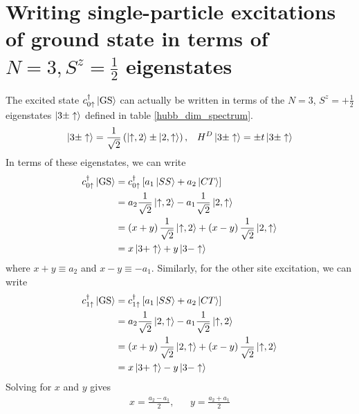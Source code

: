 \documentclass[prb]{revtex4-2}
\begin{document}
\section{Writing single-particle excitations of ground state in terms of $N=3, S^z = \frac{1}{2}$ eigenstates}
The excited state $c^\dagger_{0\uparrow}\ket{\text{GS}}$ can actually be written in terms of the $N=3$, $S^z = + \frac{1}{2}$ eigenstates $\ket{3\pm\uparrow}$ defined in table \ref{hubb_dim_spectrum}.
\begin{equation}\begin{aligned}
	\ket{3\pm \uparrow} = \frac{1}{\sqrt 2}\left(\ket{\uparrow, 2} \pm \ket{2, \uparrow}\right), && H^D \ket{3\pm \uparrow} = \pm t\ket{3\pm \uparrow}
\end{aligned}\end{equation}
In terms of these eigenstates, we can write
\begin{equation}\begin{aligned}
	c^\dagger_{0\uparrow}\ket{\text{GS}} 
	&= c^\dagger_{0\uparrow}\left[a_1 \ket{SS} + a_2 \ket{CT}\right] \\
	&= a_2 \frac{1}{\sqrt 2}\ket{\uparrow,2} - a_1 \frac{1}{\sqrt 2}\ket{2, \uparrow}\\
	&= \left(x + y\right) \frac{1}{\sqrt 2}\ket{\uparrow,2} + \left(x - y\right) \frac{1}{\sqrt 2}\ket{2, \uparrow}\\
	&=x\ket{3+ \uparrow} + y\ket{3- \uparrow}
\end{aligned}\end{equation}
where $x + y \equiv a_2$ and $x-y \equiv -a_1$. Similarly, for the other site excitation, we can write
\begin{equation}\begin{aligned}
	c^\dagger_{1\uparrow}\ket{\text{GS}} 
	&= c^\dagger_{1\uparrow}\left[a_1 \ket{SS} + a_2 \ket{CT}\right] \\
	&= a_2 \frac{1}{\sqrt 2}\ket{2, \uparrow} - a_1 \frac{1}{\sqrt 2}\ket{\uparrow, 2}\\
	&=  \left(x + y\right) \frac{1}{\sqrt 2}\ket{2, \uparrow} + \left(x - y\right) \frac{1}{\sqrt 2}\ket{\uparrow, 2}\\
	&=x\ket{3+ \uparrow} - y\ket{3- \uparrow}
\end{aligned}\end{equation}
Solving for $x$ and $y$ gives
\begin{equation}\begin{aligned}
	x = \frac{a_2 - a_1}{2}, && y = \frac{a_2 + a_1}{2}
\end{aligned}\end{equation}
\end{document}
